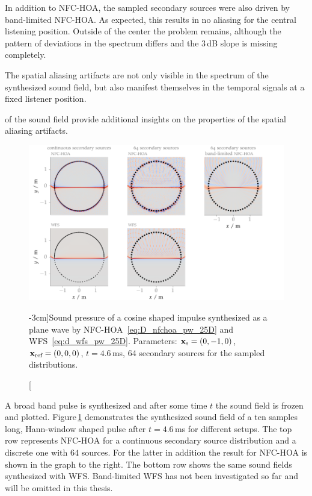 In addition to \ac{NFC-HOA}, the sampled secondary sources were also driven by
band-limited \ac{NFC-HOA}. As expected, this results in no aliasing for the
central listening position. Outside of the center the problem remains, although
the pattern of deviations in the spectrum differs and the $3$\,dB slope is
missing completely.

The spatial aliasing artifacts are not only visible in the spectrum of the
synthesized sound field, but also manifest themselves in the temporal signals at
a fixed listener position.


 of the sound field provide additional insights
on the properties of the spatial aliasing artifacts.
%
\begin{figure}[tb]
    \vspace{-0.5cm}
    \includegraphics{fig3_13/fig3_13}
    \caption[][-3cm]{Sound pressure of a cosine shaped impulse synthesized as a
    plane wave by \ac{NFC-HOA}~\protect\eqref{eq:D_nfchoa_pw_25D} and
    \ac{WFS}~\protect\eqref{eq:d_wfs_pw_25D}. Parameters:
    $\mathbf{x}_\text{s} = (0,-1,0)$, $\mathbf{x}_\text{ref} = (0,0,0)$, $t = 4.6$\,ms, 64 secondary sources for
    the sampled distributions.
    }
    \label{fig:sound_field_imp}
\end{figure}
%
A broad band pulse is synthesized and after some time $t$ the sound
field is frozen and plotted. Figure\,\ref{fig:sound_field_imp} demonstrates the
synthesized sound field of a ten samples long, Hann-window shaped pulse after $t = 4.6$\,ms for
different setups. The top row represents \twohalfD \ac{NFC-HOA} for a continuous
secondary source distribution and a discrete one with $64$ sources. For the
latter in addition the result for \ac{NFC-HOA} is shown in the graph to the
right. The bottom row shows the same sound fields synthesized with \twohalfD
\ac{WFS}.
Band-limited \ac{WFS} has not been investigated so far and will be omitted in this
thesis.

